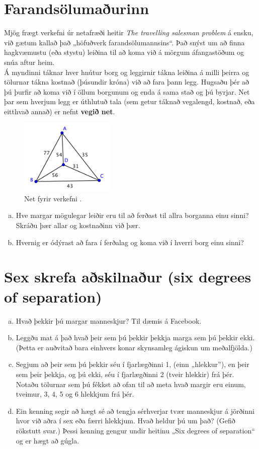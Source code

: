 \documentclass[b5paper,12pt]{book}
\renewcommand*\thesection{\arabic{section}}
\begin{document}
\section{Farandsölumaðurinn}
\label{sec:travelling}
Mjög frægt verkefni úr netafræði heitir \textit{The travelling salesman problem} á ensku, við gætum kallað það „höfuðverk farandsölumannsins“. Það snýst um að finna hagkvæmustu (eða stystu) leiðina til að koma við á mörgum áfangastöðum og snúa aftur heim. \\
Á myndinni táknar hver hnútur borg og leggirnir tákna leiðina á milli þeirra og tölurnar tákna kostnað (þúsundir króna) við að fara þann legg. Hugsaðu þér að þú þurfir að koma við í öllum borgunum og enda á sama stað og þú byrjar. Net þar sem hverjum legg er úthlutuð tala (sem getur táknað vegalengd, kostnað, eða eitthvað annað) er nefnt \textbf{vegið net}.

\begin{figure}[h]
  \includegraphics[width=0.4\textwidth, center]{Myndir/tsp1.png}
  \caption*{Net fyrir verkefni \thesection{}.}
\end{figure}

\begin{enumerate}[(a)]
    \item Hve margar mögulegar leiðir eru til að ferðast til allra borganna einu sinni? Skráðu þær allar og kostnaðinn við þær. 
    \item Hvernig er ódýrast að fara í ferðalag og koma við í hverri borg einu sinni? 
\end{enumerate}

\section{Sex skrefa aðskilnaður (six degrees of separation)}
\label{sec:sixdegrees}
\begin{enumerate}[(a)]
\item Hvað þekkir þú margar manneskjur? Til dæmis á Facebook.
\item Leggðu mat á það hvað þeir sem þú þekkir þekkja marga sem þú þekkir ekki. (Þetta er auðvitað bara einhvers konar skynsamleg ágiskun um meðalfjölda.)
\item Segjum að þeir sem þú þekkir séu í fjarlægðinni 1, (einn „hlekkur”), en þeir sem þeir þekkja, og þú ekki, séu í fjarlægðinni 2 (tveir hlekkir) frá þér. Notaðu tölurnar sem þú fékkst að ofan til að meta hvað margir eru einum, tveimur, 3, 4, 5 og 6 hlekkjum frá þér.
\item Ein kenning segir að hægt sé að tengja sérhverjar tvær manneskjur á jörðinni hvor við aðra í sex eða færri hlekkjum. Hvað heldur þú um það? (Gefið rökstutt svar.) Þessi kenning gengur undir heitinu „Six degrees of separation“ og er hægt að gúgla.
\end{enumerate}
\end{document}
